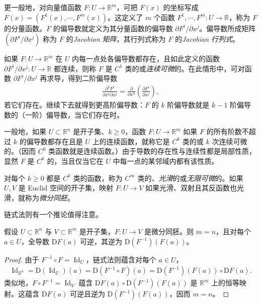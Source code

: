 \documentclass[../../main.tex]{subfiles}
\begin{document}
更一般地，对向量值函数 $F:U\to\mathbb R^m$，可把 $F(x)$ 的坐标写成 $F(x)=(F^1(x),\cdots ,F^m(x))$。这定义了 $m$ 个函数 $F^1,\cdots ,F^m:U\to\mathbb R$，称为 $F$ 的分量函数。$F$ 的偏导数就定义为其分量函数的偏导数 $\partial F^i/\partial x^j$。偏导数所成矩阵 $(\partial F^i/\partial x^j)$ 称为 $F$ 的\emph{Jacobian 矩阵}，其行列式称为 $F$ 的\emph{Jacobian 行列式}。

如果 $F:U\to\mathbb R^m$ 在 $U$ 内每一点处各偏导数都存在，且如此定义的函数 $\partial F^i/\partial x^j:U\to\mathbb R$ 都连续，则称 $F$ 是 $C^1$ 类的或\emph{连续可微}的。在此情形中，可对函数 $\partial F^i/\partial x^j$ 再求导，得到二阶偏导数
\begin{align*}
\frac{\partial^2 F^i}{\partial x^k\partial x^j}=\frac{\partial}{\partial x^k}\left(\frac{\partial F^i}{\partial x^j}\right),
\end{align*}
若它们存在。继续下去就得到更高阶偏导数：$F$ 的 $k$ 阶偏导数就是 $k-1$ 阶偏导数的（一阶）偏导数，当它们存在时。

一般地，如果 $U\subset\mathbb R^n$ 是开子集、$k\geqslant0$，函数 $F:U\to\mathbb R^m$ 如果 $F$ 的所有阶数不超过 $k$ 的偏导数都存在且是 $U$ 上的连续函数，就称它是 $C^k$ 类的或 $k$ 次连续可微的。（因而 $C^0$ 类函数就是连续函数。）由于导数的存在性与连续性都是局部性质，显然 $F$ 是 $C^k$ 的，当且仅当它在 $U$ 中每一点的某邻域内都有该性质。

对每个 $k\geqslant0$ 都是 $C^k$ 类的函数，称为 $C^\infty$ 类的、\emph{光滑}的或\emph{无限可微}的。如果 $U,V$ 是 Euclid 空间的开子集，映射 $F:U\to V$ 如果光滑、双射且其反函数也光滑，就称为\emph{微分同胚}。

链式法则有一个推论值得注意。

\begin{proposition}\label{proposition:appC-diffeo-dim}
假设 $U\subset\mathbb R^n$ 与 $V\subset\mathbb R^m$ 是开子集，$F:U\to V$ 是微分同胚。则 $m=n$，且对每个 $a\in U$，全导数 $\mathrm{D}F(a)$ 可逆，其逆为 $\mathrm{D}(F^{-1})(F(a))$。
\end{proposition}

\begin{proof}
由于 $F^{-1}\circ F=\operatorname{Id}_U$，链式法则蕴含对每个 $a\in U$，
\begin{align}\label{align:appC-diffeo-proof}
\operatorname{Id}_{\mathbb R^n}=\mathrm{D}(\operatorname{Id}_U)(a)=\mathrm{D}(F^{-1}\circ F)(a)=\mathrm{D}(F^{-1})(F(a))\circ\mathrm{D}F(a).
\end{align}
类似地，$F\circ F^{-1}=\operatorname{Id}_V$ 蕴含 $\mathrm{D}F(a)\circ\mathrm{D}(F^{-1})(F(a))$ 是 $\mathbb R^m$ 上的恒等映射。这蕴含 $\mathrm{D}F(a)$ 可逆且逆为 $\mathrm{D}(F^{-1})(F(a))$，因而 $m=n$。
\end{proof}
\end{document}
